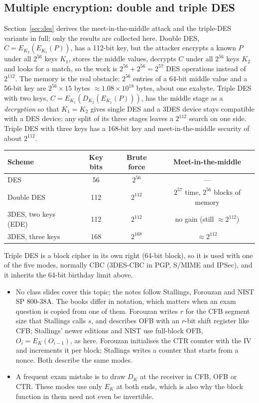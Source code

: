 \subsection{Multiple encryption: double and triple DES}
Section~\ref{sec:des} derives the meet-in-the-middle attack and the triple-DES variants in full; only the results are collected here. Double DES, $C = E_{K_2}(E_{K_1}(P))$, has a 112-bit key, but the attacker encrypts a known $P$ under all $2^{56}$ keys $K_1$, stores the middle values, decrypts $C$ under all $2^{56}$ keys $K_2$ and looks for a match, so the work is $2^{56} + 2^{56} = 2^{57}$ DES operations instead of $2^{112}$. The memory is the real obstacle: $2^{56}$ entries of a 64-bit middle value and a 56-bit key are $2^{56} \times 15$ bytes $\approx 1.08 \times 10^{18}$ bytes, about one exabyte. Triple DES with two keys, $C = E_{K_1}(D_{K_2}(E_{K_1}(P)))$, has the middle stage as a \emph{decryption} so that $K_1 = K_2$ gives single DES and a 3DES device stays compatible with a DES device; any split of its three stages leaves a $2^{112}$ search on one side. Triple DES with three keys has a 168-bit key and meet-in-the-middle security of about $2^{112}$.
\begin{center}\small
\begin{tabular}{@{}lccc@{}}
\toprule
Scheme & Key bits & Brute force & Meet-in-the-middle\\
\midrule
DES & 56 & $2^{56}$ & ---\\
Double DES & 112 & $2^{112}$ & $2^{57}$ time, $2^{56}$ blocks of memory\\
3DES, two keys (EDE) & 112 & $2^{112}$ & no gain (still $\approx 2^{112}$)\\
3DES, three keys & 168 & $2^{168}$ & $\approx 2^{112}$\\
\bottomrule
\end{tabular}
\end{center}
Triple DES is a block cipher in its own right (64-bit block), so it is used with one of the five modes, normally CBC (3DES-CBC in PGP, S/MIME and IPSec), and it inherits the 64-bit birthday limit above.

\begin{fixbox}
\begin{itemize}
  \item No class slides cover this topic; the notes follow Stallings, Forouzan and NIST SP 800-38A. The books differ in notation, which matters when an exam question is copied from one of them. Forouzan writes $r$ for the CFB segment size that Stallings calls $s$, and describes OFB with an $r$-bit shift register like CFB; Stallings' newer editions and NIST use full-block OFB, $O_i = E_K(O_{i-1})$, as here. Forouzan initialises the CTR counter with the IV and increments it per block; Stallings writes a counter that starts from a nonce. Both describe the same modes.
  \item A frequent exam mistake is to draw $D_K$ at the receiver in CFB, OFB or CTR. These modes use only $E_K$ at both ends, which is also why the block function in them need not even be invertible.
\end{itemize}
\end{fixbox}
